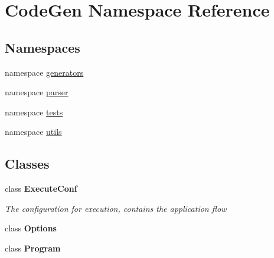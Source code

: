 \hypertarget{namespaceCodeGen}{}\section{Code\+Gen Namespace Reference}
\label{namespaceCodeGen}
\subsection*{Namespaces}
\begin{DoxyCompactItemize}
\item 
namespace \mbox{\hyperlink{namespaceCodeGen_1_1generators}{generators}}
\item 
namespace \mbox{\hyperlink{namespaceCodeGen_1_1parser}{parser}}
\item 
namespace \mbox{\hyperlink{namespaceCodeGen_1_1tests}{tests}}
\item 
namespace \mbox{\hyperlink{namespaceCodeGen_1_1utils}{utils}}
\end{DoxyCompactItemize}
\subsection*{Classes}
\begin{DoxyCompactItemize}
\item 
class {\bfseries Execute\+Conf}
\begin{DoxyCompactList}\small\item\em The configuration for execution, contains the application flow \end{DoxyCompactList}\item 
class {\bfseries Options}
\item 
class {\bfseries Program}
\end{DoxyCompactItemize}
